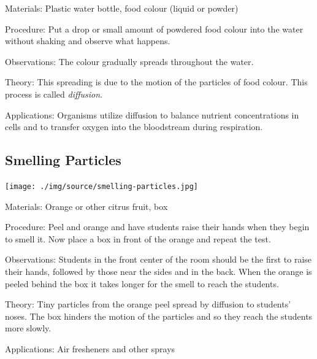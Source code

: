 \begin{multicols}{2}
\begin{description*}
\item[Materials:]{Plastic water bottle, food colour (liquid or powder)}
\item[Procedure:]{Put a drop or small amount of powdered food colour into the water without shaking and observe what happens.}
\item[Observations:]{The colour gradually spreads throughout the water.}
\item[Theory:]{This spreading is due to the motion of the particles of food colour. This process is called \emph{diffusion}.}
\item[Applications:]{Organisms utilize diffusion to balance nutrient concentrations in cells and to transfer oxygen into the bloodstream during respiration.}
\end{description*}

\subsection{Smelling Particles}

\begin{center}
\texttt{[image: ./img/source/smelling-particles.jpg]}
\end{center}

\begin{description*}
\item[Materials:]{Orange or other citrus fruit, box}
\item[Procedure:]{Peel and orange and have students raise their hands when they begin to smell it. Now place a box in front of the orange and repeat the test.}
\item[Observations:]{Students in the front center of the room should be the first to raise their hands, followed by those near the sides and in the back. When the orange is peeled behind the box it takes longer for the smell to reach the students.}
\item[Theory:]{Tiny particles from the orange peel spread by diffusion to students' noses. The box hinders the motion of the particles and so they reach the students more slowly.}
\item[Applications:]{Air fresheners and other sprays}
\end{description*}


\end{multicols}
